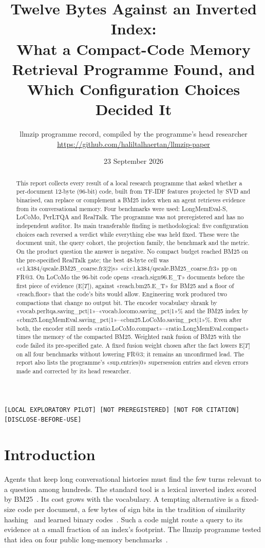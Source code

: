 \documentclass[11pt,a4paper]{article}
\title{Twelve Bytes Against an Inverted Index:\\ What a Compact-Code Memory Retrieval Programme Found, and Which Configuration Choices Decided It}
\author{llmzip programme record, compiled by the programme's head researcher\\ \small \url{https://github.com/haliltalhaertan/llmzip-paper}}
\date{23 September 2026}
\makeatletter
\newcommand{\FR}{FR@3}
\newcommand{\ET}{E[$T$]}
\newcommand{\labels}{\texttt{[LOCAL EXPLORATORY PILOT] [NOT PREREGISTERED] [NOT FOR CITATION] [DISCLOSE-BEFORE-USE]}}
\makeatother
\begin{document}
\maketitle
\begin{center}\small\labels\end{center}

\begin{abstract}
\noindent
This report collects every result of a local research programme that asked whether a per-document 12-byte (96-bit) code, built from TF-IDF features projected by SVD and binarised, can replace or complement a BM25 index when an agent retrieves evidence from its conversational memory. Four benchmarks were used: LongMemEval-S, LoCoMo, PerLTQA and RealTalk. The programme was not preregistered and has no independent auditor. Its main transferable finding is methodological: five configuration choices each reversed a verdict while everything else was held fixed. These were the document unit, the query cohort, the projection family, the benchmark and the metric. On the product question the answer is negative. No compact budget reached BM25 on the pre-specified RealTalk gate; the best 48-byte cell was «c1.k384/qscale.BM25_coarse.fr3|2|s» «ci:c1.k384/qscale.BM25_coarse.fr3» pp on \FR{}. On LoCoMo the 96-bit code opens «reach.sign96.E_T» documents before the first piece of evidence (\ET{}), against «reach.bm25.E_T» for BM25 and a floor of «reach.floor» that the code's bits would allow. Engineering work produced two compactions that change no output bit. The encoder vocabulary shrank by «vocab.perltqa.saving_pct|1»--«vocab.locomo.saving_pct|1»\% and the BM25 index by «cbm25.LongMemEval.saving_pct|1»--«cbm25.LoCoMo.saving_pct|1»\%. Even after both, the encoder still needs «ratio.LoCoMo.compact»--«ratio.LongMemEval.compact» times the memory of the compacted BM25. Weighted rank fusion of BM25 with the code failed its pre-specified gate. A fixed fusion weight chosen after the fact lowers \ET{} on all four benchmarks without lowering \FR{}; it remains an unconfirmed lead. The report also lists the programme's «sup.entries|0» supersession entries and eleven errors made and corrected by its head researcher.
\end{abstract}

\section{Introduction}
Agents that keep long conversational histories must find the few turns relevant to a question among hundreds. The standard tool is a lexical inverted index scored by BM25~\citep{robertson2009bm25}. Its cost grows with the vocabulary. A tempting alternative is a fixed-size code per document, a few bytes of sign bits in the tradition of similarity hashing~\citep{charikar2002simhash,datar2004lsh} and learned binary codes~\citep{gong2013itq,jegou2011pq,ge2014opq,gao2024rabitq}. Such a code might route a query to its evidence at a small fraction of an index's footprint. The llmzip programme tested that idea on four public long-memory benchmarks~\citep{wu2024longmemeval,maharana2024locomo,du2024perltqa,lee2025realtalk}.
\end{document}
